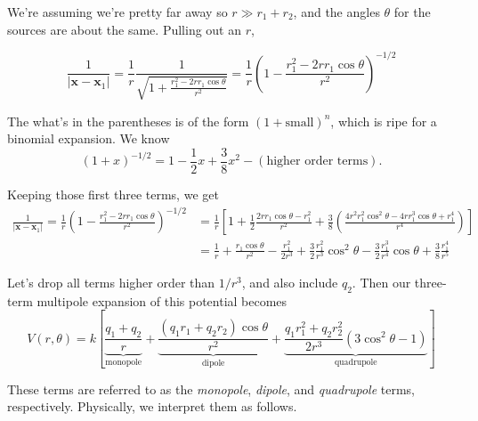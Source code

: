 \documentclass{article}
\begin{document}
We're assuming we're pretty far away so $r \gg r_1 + r_2$, and the angles $\theta$ for the sources are about the same. Pulling out an $r$,

\begin{equation*}
    \frac{1}{\left| \bm{x} - \bm{x}_1 \right|} = \frac{1}{r} \frac{1}{\sqrt{1 + \frac{r_1^2 - 2 r r_1 \cos{\theta}}{r^2}}} = \frac{1}{r} \left( 1 - \frac{r_1^2 - 2 r r_1 \cos{\theta}}{r^2} \right)^{-1/2}
\end{equation*}

The what's in the parentheses is of the form $\displaystyle \left(1 + \text{small} \right)^n$, which is ripe for a binomial expansion. We know
\begin{equation*}
    \left(1 + x\right)^{-1/2} = 1 - \frac{1}{2}x + \frac{3}{8} x^2 - \left( \text{higher order terms} \right).
\end{equation*}

Keeping those first three terms, we get
\begin{align*}
    \frac{1}{\left| \bm{x} - \bm{x}_1 \right|} = \frac{1}{r} \left( 1 - \frac{r_1^2 - 2 r r_1 \cos{\theta}}{r^2} \right)^{-1/2} &= \frac{1}{r} \left[1 + \frac{1}{2} \frac{2 r r_1 \cos{\theta} - r_1^2}{r^2} + \frac{3}{8} \left( \frac{4r^2 r_1^2 \cos^2{\theta} - 4 r r_1^3 \cos{\theta} + r_1^4}{r^4} \right)  \right] \\
                                                                                                                                &= \frac{1}{r} + \frac{r_1 \cos{\theta}}{r^2} - \frac{r_1^2}{2r^3} + \frac{3}{2} \frac{r_1^2}{r^3} \cos^2{\theta} - \frac{3}{2} \frac{r_1^3}{r^4} \cos{\theta} + \frac{3}{8} \frac{r_1^4}{r^5}
\end{align*}

Let's drop all terms higher order than $1/r^3$, and also include $q_2$. Then our three-term multipole expansion of this potential becomes
\begin{equation}
    V(r,\theta) = k \left[ \underbrace{\frac{q_1 + q_2}{r}}_{\text{monopole}} + \underbrace{\frac{\left( q_1 r_1 + q_2 r_2 \right) \cos{\theta}}{r^2}}_{\text{dipole}} + \underbrace{\frac{q_1 r_1^2 + q_2 r_2^2}{2r^3} \left( 3\cos^2{\theta} - 1 \right)}_{\text{quadrupole}} \right] \tag{1}\label{eq:multipole}
\end{equation}

These terms are referred to as the \emph{monopole}, \emph{dipole}, and \emph{quadrupole} terms, respectively. Physically, we interpret them as follows.
\end{document}
